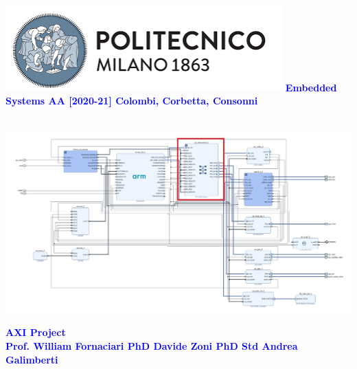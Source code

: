 




\begin{titlepage}


{\begin{table}[t!]
{\includegraphics[width=0.8\textwidth]{./../../img/Images/PolimiLogo}}
\newline
\textcolor{Blue}{\textbf{\Large{Embedded Systems AA [2020-21] } \newline \small{Colombi, Corbetta, Consonni}}}
\end{table}}~ \\ [1cm]


\includegraphics[width=1\textwidth]{./../../img/Images/axi}\\ [1cm]

\begin{flushleft}

{\textcolor{Blue}{\textbf{\Huge{AXI Project}}}} \\ [1cm]

\textcolor{Blue}{\textbf{\Large{Prof. William Fornaciari} \newline \Large{PhD Davide Zoni} \newline \Large{PhD Std Andrea Galimberti}}}

\end{flushleft}

\end{titlepage}

